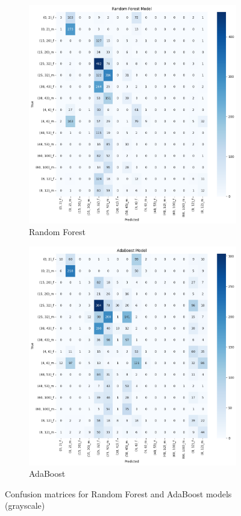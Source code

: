 \documentclass{article}
\begin{document}
\begin{figure}[H]
    \centering
    \begin{subfigure}[b]{0.48\textwidth}
        \includegraphics[width=\textwidth]{assets/confusion_matrix/grayscale/RF Model.png}
        \caption{Random Forest}
    \end{subfigure}
    \hfill
    \begin{subfigure}[b]{0.48\textwidth}
        \includegraphics[width=\textwidth]{assets/confusion_matrix/grayscale/AdaBoost Model.png}
        \caption{AdaBoost}
    \end{subfigure}
    \caption{Confusion matrices for Random Forest and AdaBoost models (grayscale)}
    \label{fig:grayscale_confusion_matrices_2}
\end{figure}
\end{document}
